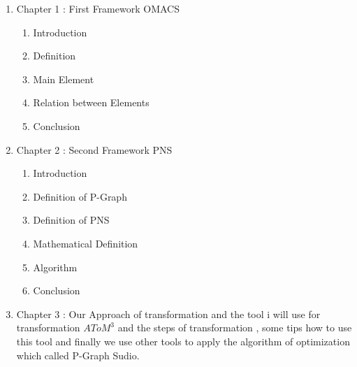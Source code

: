 \begin{enumerate}
\item Chapter 1 : First Framework OMACS
 \begin{enumerate}
 	\item Introduction
    \item Definition
    \item Main Element 
    \item Relation between Elements
    \item Conclusion
    
  \end{enumerate}
\item Chapter 2 : Second Framework PNS
 \begin{enumerate}
 	\item Introduction
    \item Definition of P-Graph
    \item Definition of PNS 
    \item Mathematical Definition
    \item Algorithm  
    \item Conclusion
  \end{enumerate}

\item Chapter 3 : Our Approach of transformation and the tool i will use for transformation $AToM^3$
and the steps of transformation , some tips how to use this tool and finally we use other tools to apply the algorithm of optimization which called P-Graph Sudio.

\end{enumerate}




